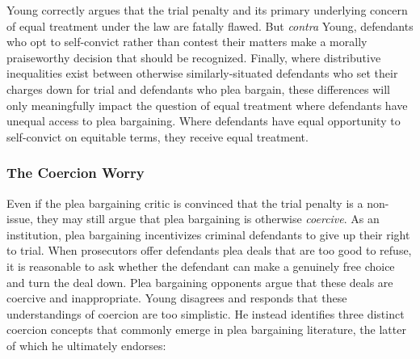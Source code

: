 Young correctly argues that the trial penalty and its primary underlying concern of equal treatment under the law are fatally flawed. But \textit{contra} Young, defendants who opt to self-convict rather than contest their matters make a morally praiseworthy decision that should be recognized. Finally, where distributive inequalities exist between otherwise similarly-situated defendants who set their charges down for trial and defendants who plea bargain, these differences will only meaningfully impact the question of equal treatment where defendants have unequal access to plea bargaining. Where defendants have equal opportunity to self-convict on equitable terms, they receive equal treatment.

\subsubsection{The Coercion Worry}

Even if the plea bargaining critic is convinced that the trial penalty is a non-issue, they may still argue that plea bargaining is otherwise \textit{coercive}. As an institution, plea bargaining incentivizes criminal defendants to give up their right to trial. When prosecutors offer defendants plea deals that are too good to refuse, it is reasonable to ask whether the defendant can make a genuinely free choice and turn the deal down. Plea bargaining opponents argue that these deals are coercive and inappropriate. Young disagrees and responds that these understandings of coercion are too simplistic. He instead identifies three distinct coercion concepts that commonly emerge in plea bargaining literature, the latter of which he ultimately endorses:

